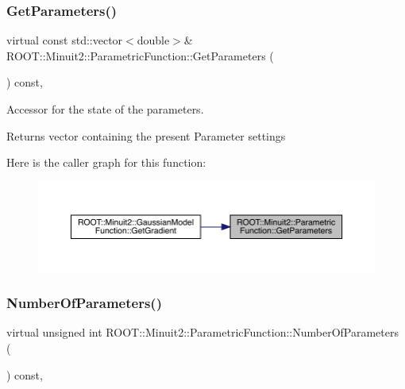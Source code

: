 \subsubsection{\texorpdfstring{GetParameters()}{GetParameters()}\hspace{0.1cm}{\footnotesize\ttfamily [2/2]}}
{\footnotesize\ttfamily virtual const std\+::vector$<$double$>$\& R\+O\+O\+T\+::\+Minuit2\+::\+Parametric\+Function\+::\+Get\+Parameters (\begin{DoxyParamCaption}{ }\end{DoxyParamCaption}) const\hspace{0.3cm}{\ttfamily [inline]}, {\ttfamily [virtual]}}

Accessor for the state of the parameters.

\begin{DoxyReturn}{Returns}
vector containing the present Parameter settings 
\end{DoxyReturn}
Here is the caller graph for this function\+:\nopagebreak
\begin{figure}[H]
\begin{center}
\leavevmode
\includegraphics[width=350pt]{d3/d76/classROOT_1_1Minuit2_1_1ParametricFunction_ac3e70b4d9b0cbe60c529823f6a612a5e_icgraph}
\end{center}
\end{figure}
\mbox{\label{classROOT_1_1Minuit2_1_1ParametricFunction_a8e5e21de5e8f6e5bedd1ae7ea27b24ac}} 
\subsubsection{\texorpdfstring{NumberOfParameters()}{NumberOfParameters()}\hspace{0.1cm}{\footnotesize\ttfamily [1/2]}}
{\footnotesize\ttfamily virtual unsigned int R\+O\+O\+T\+::\+Minuit2\+::\+Parametric\+Function\+::\+Number\+Of\+Parameters (\begin{DoxyParamCaption}{ }\end{DoxyParamCaption}) const\hspace{0.3cm}{\ttfamily [inline]}, {\ttfamily [virtual]}}


